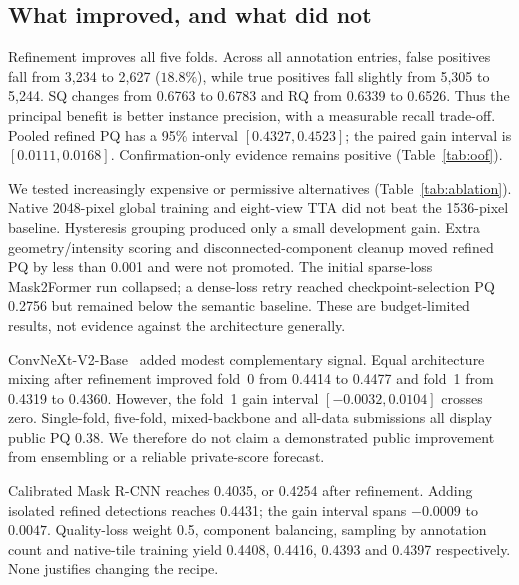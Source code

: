 \documentclass[sigconf]{acmart}
\begin{document}
\subsection{What improved, and what did not}
Refinement improves all five folds. Across all annotation entries, false positives fall from 3,234 to 2,627 ($18.8\%$), while true positives fall slightly from 5,305 to 5,244. SQ changes from 0.6763 to 0.6783 and RQ from 0.6339 to 0.6526. Thus the principal benefit is better instance precision, with a measurable recall trade-off. Pooled refined PQ has a 95\% interval $[0.4327,0.4523]$; the paired gain interval is $[0.0111,0.0168]$. Confirmation-only evidence remains positive (Table~\ref{tab:oof}).

We tested increasingly expensive or permissive alternatives (Table~\ref{tab:ablation}). Native 2048-pixel global training and eight-view TTA did not beat the 1536-pixel baseline. Hysteresis grouping produced only a small development gain. Extra geometry/intensity scoring and disconnected-component cleanup moved refined PQ by less than 0.001 and were not promoted. The initial sparse-loss Mask2Former run collapsed; a dense-loss retry reached checkpoint-selection PQ 0.2756 but remained below the semantic baseline. These are budget-limited results, not evidence against the architecture generally.

ConvNeXt-V2-Base~\cite{convnextv2} added modest complementary signal. Equal architecture mixing after refinement improved fold~0 from 0.4414 to 0.4477 and fold~1 from 0.4319 to 0.4360. However, the fold~1 gain interval $[-0.0032,0.0104]$ crosses zero. Single-fold, five-fold, mixed-backbone and all-data submissions all display public PQ 0.38. We therefore do not claim a demonstrated public improvement from ensembling or a reliable private-score forecast.

Calibrated Mask R-CNN reaches 0.4035, or 0.4254 after refinement. Adding isolated refined detections reaches 0.4431; the gain interval spans $-0.0009$ to $0.0047$. Quality-loss weight 0.5, component balancing, sampling by annotation count and native-tile training yield 0.4408, 0.4416, 0.4393 and 0.4397 respectively. None justifies changing the recipe.
\end{document}
